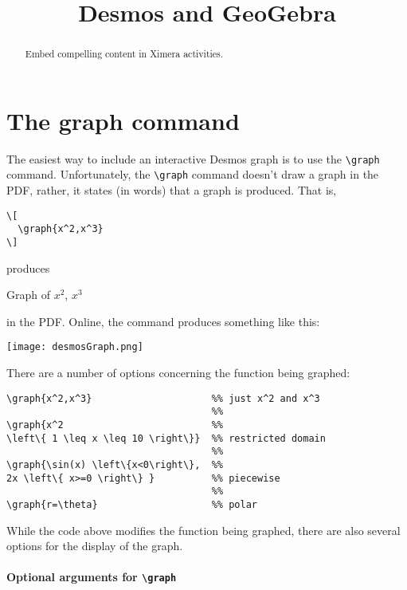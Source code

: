 \documentclass{ximera}
\title{Desmos and GeoGebra}
\begin{document}
\begin{abstract}
  Embed compelling content in Ximera activities.
\end{abstract}
\maketitle

\section{The graph command}

The easiest way to include an interactive Desmos graph is to use the
\verb|\graph| command. Unfortunately, the \verb|\graph| command
doesn't draw a graph in the PDF, rather, it states (in words) that a
graph is produced. That is,
\begin{verbatim}
\[
  \graph{x^2,x^3}
\]
\end{verbatim}
produces
\begin{center}
  Graph of $x^2$, $x^3$
\end{center}
in the PDF. Online, the command produces something like this:
\begin{image}
  \texttt{[image: desmosGraph.png]}
\end{image}
There are a number of options concerning the function being graphed:
\begin{verbatim}
\graph{x^2,x^3}                     %% just x^2 and x^3
                                    %%
\graph{x^2                          %%
\left\{ 1 \leq x \leq 10 \right\}}  %% restricted domain
                                    %%
\graph{\sin(x) \left\{x<0\right\},  %%
2x \left\{ x>=0 \right\} }          %% piecewise
                                    %%
\graph{r=\theta}                    %% polar 
\end{verbatim}
While the code above modifies the function being graphed, there are also several options for the display of the graph.

\paragraph{Optional arguments for \texttt{\textbackslash graph}}
\end{document}
